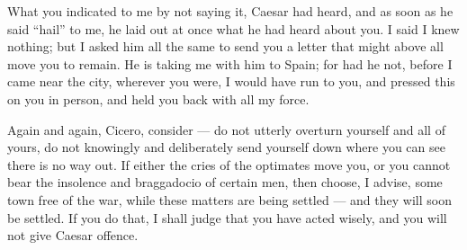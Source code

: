  What you indicated to me by not saying it, Caesar had heard, and as soon as he said ``hail'' to me, he laid out at once what he had heard about you. I said I knew nothing; but I asked him all the same to send you a letter that might above all move you to remain. He is taking me with him to Spain; for had he not, before I came near the city, wherever you were, I would have run to you, and pressed this on you in person, and held you back with all my force.

 Again and again, Cicero, consider --- do not utterly overturn yourself and all of yours, do not knowingly and deliberately send yourself down where you can see there is no way out. If either the cries of the optimates move you, or you cannot bear the insolence and braggadocio of certain men, then choose, I advise, some town free of the war, while these matters are being settled --- and they will soon be settled. If you do that, I shall judge that you have acted wisely, and you will not give Caesar offence.
